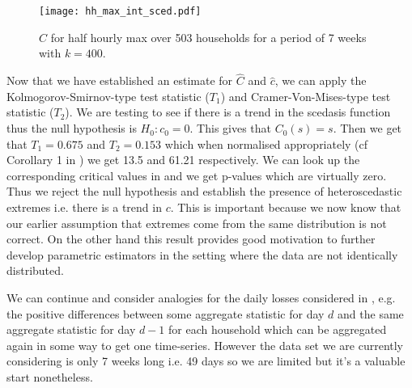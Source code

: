 \begin{figure}
\centering
\texttt{[image: hh\_max\_int\_sced.pdf]}
\caption{\label{fig:myintsced_hh_max} $\hat{C}$ for half hourly max over 503 households for a period of 7 weeks with $k=400$.}
\end{figure}

Now that we have established an estimate for $\hat{C}$ and $\hat{c}$, we can apply the Kolmogorov-Smirnov-type test statistic ($T_1$) and Cramer-Von-Mises-type test statistic ($T_2$). We are testing to see if there is a trend in the scedasis function thus the null hypothesis is $H_0: c_0 =0$. This gives that $C_0(s) = s$. Then we get that $T_1 = 0.675$ and $T_2 = 0.153$ which when normalised appropriately (cf Corollary 1 in \citet{einmahl16}) we get 13.5 and 61.21 respectively. We can look up the corresponding critical values in \citet{tables1,tables2} and we get p-values which are virtually zero. Thus we reject the null hypothesis and establish the presence of heteroscedastic extremes i.e. there is a trend in $c$. This is important because we now know that our earlier assumption that extremes come from the same distribution is not correct. On the other hand this result provides good motivation to further develop parametric estimators in the setting where the data are not identically distributed.

We can continue and consider analogies for the daily losses considered in \cite{einmahl16}, e.g. the positive differences between some aggregate statistic for day $d$ and the same aggregate statistic for day $d-1$ for each household which can be aggregated again in some way to get one time-series. However the data set we are currently considering is only 7 weeks long i.e. 49 days so we are limited but it's a valuable start nonetheless.

